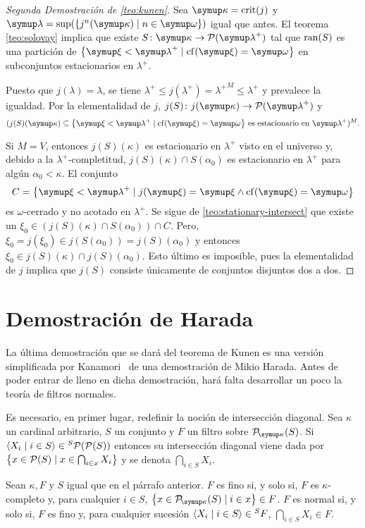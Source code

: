 \begin{proof}[Segunda Demostración de \ref{teo:kunen}]
	Sea $\kappa=\crit{j}$ y $\lambda=\sup(\set{j^n(\kappa)\mid n\in\omega})$ igual que antes.
	El teorema \ref{teo:solovay} implica que existe $S\colon\kappa\to\pwset{\lambda^+}$ tal que
	$\operatorname{ran}(S)$ es una partición de $\set{\xi < \lambda^+\mid \cf(\xi) = \omega}$ en subconjuntos
	estacionarios en $\lambda^+$.

	Puesto que $j(\lambda)=\lambda$, se tiene $\lambda^+\leq j(\lambda^+) = {\lambda^+}^M\leq \lambda^+$
	y prevalece la igualdad. Por la elementalidad de $j$, $j(S)\colon j(\kappa)\to\pwset{\lambda^+}$ y
	\[
		(
		    j(S)(\kappa)\subseteq\set{\xi < \lambda^+\mid \cf(\xi) = \omega}
		    \,\text{es estacionario en $\lambda^+$}
		)^M.
	\]

	Si $M=V$, entonces $j(S)(\kappa)$ es estacionario en $\lambda^+$ visto en el universo y,
	debido a la $\lambda^+$-completitud, $j(S)(\kappa)\cap S(\alpha_0)$ es estacionario en $\lambda^+$
	para algún $\alpha_0<\kappa$. El conjunto
	\[
	    C = \set{\xi<\lambda^+\mid j(\xi)=\xi \land \cf(\xi)=\omega}
	\]
	es $\omega$-cerrado y no acotado en $\lambda^+$. Se sigue de \ref{teo:stationary-intersect} que
	existe un $\xi_0\in (j(S)(\kappa)\cap S(\alpha_0))\cap C$. Pero,
	$\xi_0 = j(\xi_0)\in j(S(\alpha_0)) = j(S)(\alpha_0)$ y entonces $\xi_0\in j(S)(\kappa)\cap j(S)(\alpha_0)$.
	Esto último es imposible, pues la elementalidad de $j$ implica que $j(S)$ consiste únicamente de conjuntos
	disjuntos dos a dos.
\end{proof}

\section{Demostración de Harada}

La última demostración que se dará del teorema de Kunen es una versión simplificada
por Kanamori~\autocite{kanamori_higher_2009} de una demostración de Mikio Harada.
Antes de poder entrar de lleno en dicha demostración, hará falta desarrollar
un poco la teoría de filtros normales.

Es necesario, en primer lugar, redefinir la noción de intersección diagonal.
Sea $\kappa$ un cardinal arbitrario, $S$ un conjunto y $F$ un filtro sobre $\pwset[\kappa]{S}$.
Si $\seq{X_i\mid i\in S}\in {}^S\pwset{\pwset S}$ entonces su intersección diagonal viene
dada por $\set{x\in\pwset{S}\mid x\in\bigcap_{i\in x} X_i}$ y se denota $\dint_{i\in S} X_i$.

\begin{defi}
    Sean $\kappa, F$ y $S$ igual que en el párrafo anterior.
    $F$ es fino si, y solo si, $F$ es $\kappa$-completo y, para cualquier $i\in S$,
    $\set{x\in\pwset[\kappa]{S}\mid i\in x}\in F$.
    $F$ es normal si, y solo si, $F$ es fino y, para cualquier sucesión
    $\langle X_i\mid i\in S \rangle\in {}^SF$, $\dint_{i\in S} X_i\in F$.
\end{defi}

